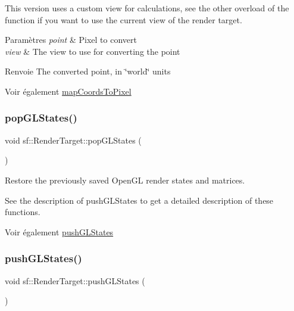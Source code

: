This version uses a custom view for calculations, see the other overload of the function if you want to use the current view of the render target.


\begin{DoxyParams}{Paramètres}
{\em point} & Pixel to convert \\
\hline
{\em view} & The view to use for converting the point\\
\hline
\end{DoxyParams}
\begin{DoxyReturn}{Renvoie}
The converted point, in \char`\"{}world\char`\"{} units
\end{DoxyReturn}
\begin{DoxySeeAlso}{Voir également}
\hyperlink{classsf_1_1RenderTarget_ad92a9f0283aa5f3f67e473c1105b68cf}{map\+Coords\+To\+Pixel} 
\end{DoxySeeAlso}
\mbox{\label{classsf_1_1RenderTarget_ad5a98401113df931ddcd54c080f7aa8e}} 
\subsubsection{\texorpdfstring{pop\+G\+L\+States()}{popGLStates()}}
{\footnotesize\ttfamily void sf\+::\+Render\+Target\+::pop\+G\+L\+States (\begin{DoxyParamCaption}{ }\end{DoxyParamCaption})}



Restore the previously saved Open\+GL render states and matrices. 

See the description of push\+G\+L\+States to get a detailed description of these functions.

\begin{DoxySeeAlso}{Voir également}
\hyperlink{classsf_1_1RenderTarget_a8d1998464ccc54e789aaf990242b47f7}{push\+G\+L\+States} 
\end{DoxySeeAlso}
\mbox{\label{classsf_1_1RenderTarget_a8d1998464ccc54e789aaf990242b47f7}} 
\subsubsection{\texorpdfstring{push\+G\+L\+States()}{pushGLStates()}}
{\footnotesize\ttfamily void sf\+::\+Render\+Target\+::push\+G\+L\+States (\begin{DoxyParamCaption}{ }\end{DoxyParamCaption})}



